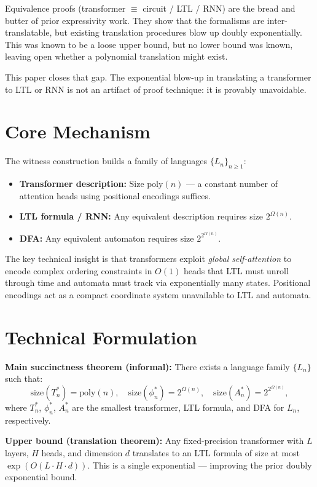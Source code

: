 \documentclass[10pt,twocolumn]{article}
\begin{document}
Equivalence proofs (transformer $\equiv$ circuit / LTL / RNN) are the bread
and butter of prior expressivity work. They show that the formalisms are
inter-translatable, but existing translation procedures blow up doubly
exponentially. This was known to be a loose upper bound, but no lower bound
was known, leaving open whether a polynomial translation might exist.

This paper closes that gap. The exponential blow-up in translating a
transformer to LTL or RNN is not an artifact of proof technique: it is
provably unavoidable.

\section{Core Mechanism}

The witness construction builds a family of languages $\{L_n\}_{n \geq 1}$:
\begin{itemize}[itemsep=2pt,parsep=0pt]
  \item \textbf{Transformer description:} Size $\mathrm{poly}(n)$ --- a
    constant number of attention heads using positional encodings suffices.
  \item \textbf{LTL formula / RNN:} Any equivalent description requires
    size $2^{\Omega(n)}$.
  \item \textbf{DFA:} Any equivalent automaton requires
    size $2^{2^{\Omega(n)}}$.
\end{itemize}

The key technical insight is that transformers exploit \emph{global
self-attention} to encode complex ordering constraints in $O(1)$ heads that
LTL must unroll through time and automata must track via exponentially
many states. Positional encodings act as a compact coordinate system
unavailable to LTL and automata.

\section{Technical Formulation}

\textbf{Main succinctness theorem (informal):} There exists a language
family $\{L_n\}$ such that:
\[
\text{size}(T^*_n) = \mathrm{poly}(n), \quad
\text{size}(\phi^*_n) = 2^{\Omega(n)}, \quad
\text{size}(A^*_n) = 2^{2^{\Omega(n)}},
\]
where $T^*_n$, $\phi^*_n$, $A^*_n$ are the smallest transformer,
LTL formula, and DFA for $L_n$, respectively.

\textbf{Upper bound (translation theorem):} Any fixed-precision transformer
with $L$ layers, $H$ heads, and dimension $d$ translates to an LTL
formula of size at most $\exp(O(L \cdot H \cdot d))$. This is a single
exponential --- improving the prior doubly exponential bound.
\end{document}
